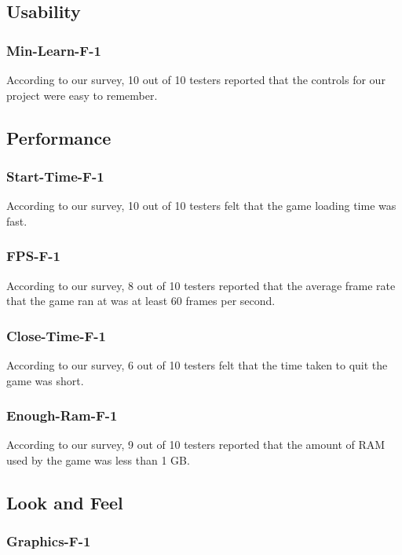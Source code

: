 \documentclass[12pt, titlepage]{article}
\begin{document}
\subsection{Usability}
		\subsubsection{Min-Learn-F-1}
		
		According to our survey, 10 out of 10 testers reported that the controls for our project were easy to remember.
\subsection{Performance}
	\subsubsection{Start-Time-F-1}
	
	According to our survey, 10 out of 10 testers felt that the game loading time was fast.
	\subsubsection{FPS-F-1}
	
	According to our survey, 8 out of 10 testers reported that the average frame rate that the game ran at was at least 60 frames per second.
	\subsubsection{Close-Time-F-1}
	
	According to our survey, 6 out of 10 testers felt that the time taken to quit the game was short.
	
	\subsubsection{Enough-Ram-F-1}
	
	According to our survey, 9 out of 10 testers reported that the amount of RAM used by the game was less than 1 GB.
	
\subsection{Look and Feel}
	\subsubsection{Graphics-F-1}
	
\end{document}
